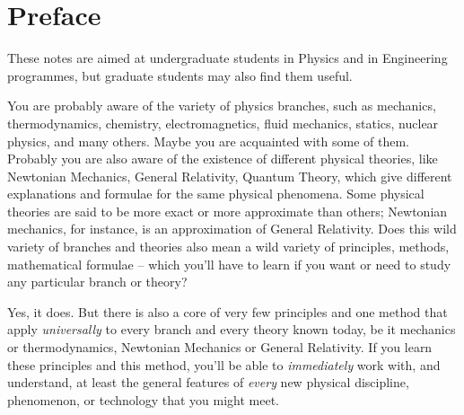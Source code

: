 \documentclass[a4paper,12pt,%
onecolumn,oneside,titlepage,%
british%
]{memoir}
\newcommand{\addchap}[1]{\chapter*[#1]{#1}\addcontentsline{toc}{chapter}{#1}}
\renewcommand*{\|}[1][]{\nonscript\:#1\vert\nonscript\:\mathopen{}}
\begin{document}
\setlength{\epigraphwidth}{0.66\linewidth}
\epigraphfontsize{\footnotesize}
\setlength{\epigraphrule}{0pt}




\clearpage
{}
\tableofcontents*
\label{sec:toc}

\setcounter{chapter}{-1}


\printpagenotes*
\clearpage
\addchap{Preface}
\label{cha:preface}

These notes are aimed at undergraduate students in Physics and in Engineering programmes, but graduate students may also find them useful.

You are probably aware of the variety of physics branches, such as mechanics, thermodynamics, chemistry, electromagnetics, fluid mechanics, statics, nuclear physics, and many others. Maybe you are acquainted with some of them. Probably you are also aware of the existence of different physical theories, like Newtonian Mechanics, General Relativity, Quantum Theory, which give different explanations and formulae for the same physical phenomena. Some physical theories are said to be more exact or more approximate than others; Newtonian mechanics, for instance, is an approximation of General Relativity. Does this wild variety of branches and theories also mean a wild variety of principles, methods, mathematical formulae -- which you'll have to learn if you want or need to study any particular branch or theory?

Yes, it does. But there is also a core of very few principles and one method that apply \emph{universally} to every branch and every theory known today, be it mechanics or thermodynamics, Newtonian Mechanics or General Relativity. If you learn these principles and this method, you'll be able to \emph{immediately} work with, and understand, at least the general features of \emph{every} new physical discipline, phenomenon, or technology that you might meet.
\end{document}
